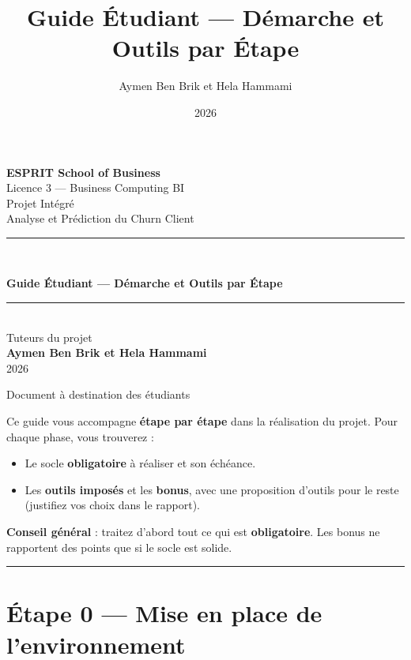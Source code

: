 \documentclass[11pt,a4paper]{article}
\title{\color{primary}\textbf{Guide Étudiant --- Démarche et Outils par
Étape}}
\author{Aymen Ben Brik et Hela Hammami}
\date{2026}
\renewenvironment{quote}{\begin{quotebox}}{\end{quotebox}}
\providecommand{\tightlist}{\setlength{\itemsep}{0pt}\setlength{\parskip}{0pt}}
\begin{document}
\begin{titlepage}
\centering
\vspace*{1.5cm}

{\Large\bfseries ESPRIT School of Business}\\[0.3cm]
{\large Licence 3 --- Business Computing BI}\\[2cm]

{\color{gray}\large Projet Intégré}\\[0.3cm]
{\color{gray}\large Analyse et Prédiction du Churn Client}\\[2.2cm]

\rule{0.85\linewidth}{1.2pt}\\[0.6cm]
{\Huge\bfseries\color{primary} Guide Étudiant --- Démarche et Outils par
Étape\par}
\rule{0.85\linewidth}{1.2pt}\\[2cm]

{\large Tuteurs du projet}\\[0.2cm]
{\Large\bfseries Aymen Ben Brik et Hela Hammami}\\[1cm]
{\large 2026}

\vfill
{\color{gray}\small Document à destination des étudiants}
\end{titlepage}

\tableofcontents
\newpage

Ce guide vous accompagne \textbf{étape par étape} dans la réalisation du
projet. Pour chaque phase, vous trouverez :

\begin{itemize}
\tightlist
\item
  Le socle \textbf{obligatoire} à réaliser et son échéance.
\item
  Les \textbf{outils imposés} et les \textbf{bonus}, avec une
  proposition d'outils pour le reste (justifiez vos choix dans le
  rapport).
\end{itemize}

\begin{quote}
\textbf{Conseil général} : traitez d'abord tout ce qui est
\textbf{obligatoire}. Les bonus ne rapportent des points que si le socle
est solide.
\end{quote}

\begin{center}\rule{0.5\linewidth}{0.5pt}\end{center}

\section{Étape 0 --- Mise en place de
l'environnement}\label{uxe9tape-0-mise-en-place-de-lenvironnement}
\end{document}
